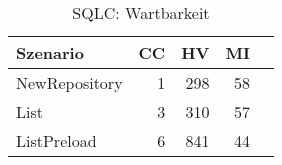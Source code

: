 \begin{table}[ht]
\centering
\caption{SQLC: Wartbarkeit}
\begin{tabular}{lrrrr}
\toprule
Szenario & CC & HV & MI \\
\midrule
	NewRepository & 1 & 298 & 58 \\
	List & 3 & 310 & 57 \\
	ListPreload & 6 & 841 & 44 \\
\bottomrule
\end{tabular}
\label{tab:sqlc_maintainability}
\end{table}
	